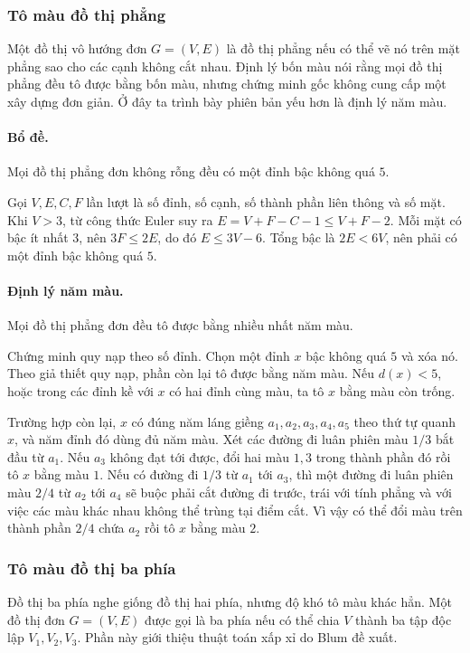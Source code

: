 \documentclass[11pt]{article}
\begin{document}
\subsubsection{Tô màu đồ thị phẳng}

Một đồ thị vô hướng đơn $G=(V,E)$ là đồ thị phẳng nếu có thể vẽ nó trên mặt
phẳng sao cho các cạnh không cắt nhau. Định lý bốn màu nói rằng mọi đồ thị
phẳng đều tô được bằng bốn màu, nhưng chứng minh gốc không cung cấp một xây
dựng đơn giản. Ở đây ta trình bày phiên bản yếu hơn là định lý năm màu.

\paragraph{Bổ đề.}
Mọi đồ thị phẳng đơn không rỗng đều có một đỉnh bậc không quá $5$.

Gọi $V,E,C,F$ lần lượt là số đỉnh, số cạnh, số thành phần liên thông và số mặt.
Khi $V>3$, từ công thức Euler suy ra $E=V+F-C-1\le V+F-2$. Mỗi mặt có bậc ít
nhất $3$, nên $3F\le 2E$, do đó $E\le 3V-6$. Tổng bậc là $2E<6V$, nên phải có
một đỉnh bậc không quá $5$.

\paragraph{Định lý năm màu.}
Mọi đồ thị phẳng đơn đều tô được bằng nhiều nhất năm màu.

Chứng minh quy nạp theo số đỉnh. Chọn một đỉnh $x$ bậc không quá $5$ và xóa nó.
Theo giả thiết quy nạp, phần còn lại tô được bằng năm màu. Nếu $d(x)<5$, hoặc
trong các đỉnh kề với $x$ có hai đỉnh cùng màu, ta tô $x$ bằng màu còn trống.

Trường hợp còn lại, $x$ có đúng năm láng giềng $a_1,a_2,a_3,a_4,a_5$ theo thứ
tự quanh $x$, và năm đỉnh đó dùng đủ năm màu. Xét các đường đi luân phiên màu
$1/3$ bắt đầu từ $a_1$. Nếu $a_3$ không đạt tới được, đổi hai màu $1,3$ trong
thành phần đó rồi tô $x$ bằng màu $1$. Nếu có đường đi $1/3$ từ $a_1$ tới
$a_3$, thì một đường đi luân phiên màu $2/4$ từ $a_2$ tới $a_4$ sẽ buộc phải
cắt đường đi trước, trái với tính phẳng và với việc các màu khác nhau không thể
trùng tại điểm cắt. Vì vậy có thể đổi màu trên thành phần $2/4$ chứa $a_2$ rồi
tô $x$ bằng màu $2$.

\subsubsection{Tô màu đồ thị ba phía}

Đồ thị ba phía nghe giống đồ thị hai phía, nhưng độ khó tô màu khác hẳn. Một
đồ thị đơn $G=(V,E)$ được gọi là ba phía nếu có thể chia $V$ thành ba tập độc
lập $V_1,V_2,V_3$. Phần này giới thiệu thuật toán xấp xỉ do Blum đề xuất.
\end{document}
